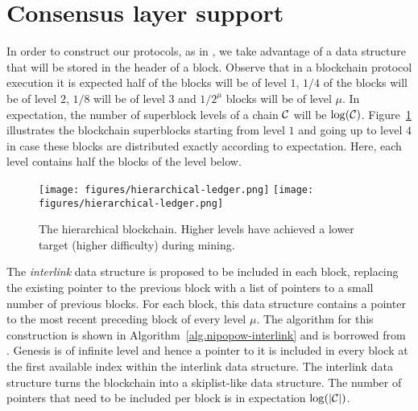 \section{Consensus layer support} \label{sec.consensus}

\label{sec.interlink}

In order to construct our protocols, as in \cite{KLS}, we take advantage
of a data structure that will be stored in the header of a block.
Observe that in a blockchain protocol execution
it is expected half of the blocks will be of level $1$, $1/4$
of the blocks will be of level $2$, $1/8$ will be of level $3$ and $1/2^\mu$
blocks will be of level $\mu$. In expectation, the number of superblock levels
of a chain $\mathcal{C}$ will be $\log(\mathcal{C})$. Figure~\ref{fig.hierarchy}
illustrates the blockchain superblocks starting from level $1$ and going up to
level $4$ in case these blocks are distributed exactly according to expectation.
Here, each level contains half the blocks of the level below.

\begin{figure}
    \caption{The hierarchical blockchain.
    Higher levels have achieved a lower target (higher difficulty) during mining.}
    \centering
    \iftwocolumn
        \texttt{[image: figures/hierarchical-ledger.png]}
    \else
        \texttt{[image: figures/hierarchical-ledger.png]}
    \fi
    \label{fig.hierarchy}
\end{figure}

The \textit{interlink} data structure is proposed to be included in each block,
replacing the existing pointer to the previous block with a list of pointers to
a small number of previous blocks. For each block, this data structure contains
a pointer to the most recent preceding block of every level $\mu$. The algorithm
for this construction is shown in Algorithm~\ref{alg.nipopow-interlink} and is
borrowed from \cite{KLS}. Genesis is of infinite level and hence a pointer to it
is included in every block at the first available index within the interlink
data structure. The interlink data structure turns the blockchain into a
skiplist-like data structure.  The number of pointers that need to be included
per block is in expectation $\log(|\mathcal{C}|)$.

